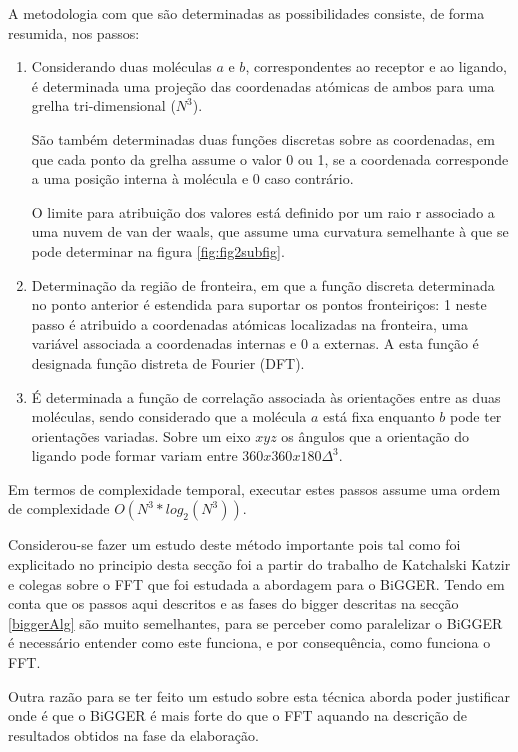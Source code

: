  A metodologia com que são determinadas as possibilidades consiste, de forma resumida, nos passos:
\begin{enumerate}
	\item Considerando duas moléculas $a$ e $b$, correspondentes  ao receptor e ao ligando, é determinada uma projeção das coordenadas atómicas de ambos para uma grelha tri-dimensional ($N^{3}$). 
	
	São também determinadas  duas funções discretas sobre as coordenadas, em que cada ponto da grelha assume o valor 0 ou 1, se a coordenada corresponde a uma posição interna à molécula e 0 caso contrário. 
	
	O limite para atribuição dos valores está definido por um raio r associado a uma nuvem de van der waals, que assume uma curvatura semelhante à que se pode determinar na figura \ref{fig:fig2subfig}.
	
	\item Determinação da região de fronteira, em que a função discreta determinada no ponto anterior é estendida para suportar os pontos fronteiriços: 1 neste passo é atribuido a coordenadas atómicas localizadas na fronteira, uma variável associada a coordenadas internas e 0 a externas. A esta função é designada função distreta de Fourier (DFT).
	
	\item É determinada a função de correlação associada às orientações entre as duas moléculas, sendo considerado que a molécula $a$ está fixa enquanto $b$ pode ter orientações variadas. Sobre um eixo $xyz$ os ângulos que a orientação do ligando pode formar variam entre $360x360x180\Delta^{3}$.

\end{enumerate} 
Em termos de complexidade temporal, executar estes passos assume uma ordem de complexidade $O(N^{3}*log_2(N^{3}))$\cite{teseProf}.

Considerou-se fazer um estudo deste método importante pois tal como foi explicitado no principio desta secção foi a partir do trabalho de Katchalski Katzir e colegas sobre o FFT que foi estudada a abordagem para o BiGGER\cite{teseProf}. Tendo em conta que os passos aqui descritos e as fases do bigger descritas na secção \ref{biggerAlg} são muito semelhantes, para se perceber como paralelizar o BiGGER é necessário entender como este funciona, e por consequência, como funciona o FFT. 

Outra razão para se ter feito um estudo sobre esta técnica aborda poder justificar onde é que o BiGGER é mais forte do que o FFT aquando na descrição de resultados obtidos na fase da elaboração.

